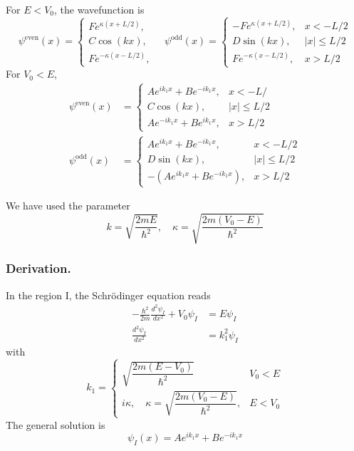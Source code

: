 \documentclass[../../../main.tex]{subfiles}
\begin{document}
For $E<V_0$, the wavefunction is
\begin{equation*}
    \psi^{\text{even}}(x) =
    \begin{cases}
        F e^{\kappa (x + L/2)}, \\
        C \cos(k x),            \\
        F e^{-\kappa (x - L/2)},
    \end{cases}
    \quad
    \psi^{\text{odd}}(x) =
    \begin{cases}
        - F e^{\kappa (x + L/2)}, & x < -L/2    \\
        D \sin(k x),              & |x| \le L/2 \\
        F e^{-\kappa (x - L/2)},  & x > L/2
    \end{cases}
\end{equation*}
For $V_0<E$,
\begin{align*}
    \psi^{\text{even}}(x) &= 
    \begin{cases}
        A e^{i k_1 x} + B e^{-i k_1 x},  & x < -L/\\
        C \cos(k x),                     & |x| \le L/2 \\
        A e^{-i k_1 x} + B e^{i k_1 x},& x > L/2
    \end{cases}
    \\
    \psi^{\text{odd}}(x) &= 
    \begin{cases}
        A e^{i k_1 x} + B e^{-i k_1 x},                & x < -L/2    \\
        D \sin(k x),                                   & |x| \le L/2 \\
        -\left( A e^{i k_1 x} + B e^{-i k_1 x}\right), & x > L/2
    \end{cases}
\end{align*}

We have used the parameter
\begin{equation*}
    k = \sqrt{\frac{2 m E}{\hbar^2}}, \quad
    \kappa = \sqrt{\frac{2 m (V_0 - E)}{\hbar^2}}
\end{equation*}

\subsubsection{Derivation.}
In the region I, the Schrödinger equation reads
\begin{align*}
    -\frac{\hbar^2}{2 m} \frac{d^2 \psi_{I}}{dx^2} + V_0 \psi_{I} & =  E \psi_{I}   \\
    \frac{d^2 \psi_{I}}{dx^2}                                     & = k_1^2\psi_{I}
\end{align*}
with
\begin{equation*}
    k_1 =
    \begin{cases}
        \sqrt{\dfrac{2 m (E - V_0)}{\hbar^2}}                           & V_0<E   \\
        i \kappa, \quad \kappa = \sqrt{\dfrac{2 m (V_0 - E)}{\hbar^2}}, & E < V_0
    \end{cases}
\end{equation*}
The general solution is
\begin{equation*}
    \psi_{I}(x) = A e^{ik_1x} + B e^{-ik_1 x}
\end{equation*}
\end{document}
